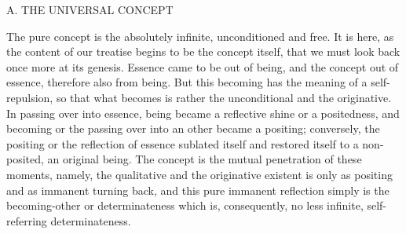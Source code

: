 A. THE UNIVERSAL CONCEPT

The pure concept is the absolutely infinite,
unconditioned and free.
It is here, as the content of our treatise
begins to be the concept itself,
that we must look back once more at its genesis.
Essence came to be out of being,
and the concept out of essence,
therefore also from being.
But this becoming has the
meaning of a self-repulsion,
so that what becomes is rather
the unconditional and the originative.
In passing over into essence,
being became a reflective shine or a positedness,
and becoming or the passing over into an other
became a positing;
conversely, the positing or the reflection of essence
sublated itself and restored itself to
a non-posited, an original being.
The concept is the mutual penetration of these moments,
namely, the qualitative and the originative existent is
only as positing and as immanent turning back,
and this pure immanent reflection simply is
the becoming-other or determinateness
which is, consequently, no less
infinite, self-referring determinateness.


